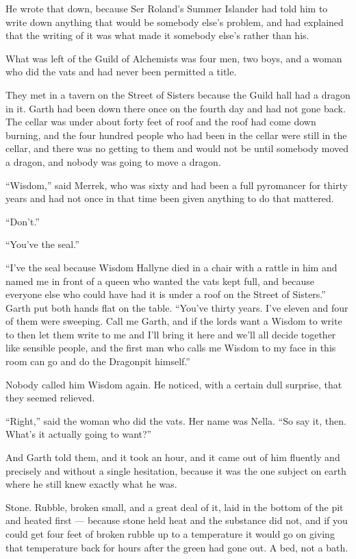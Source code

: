 He wrote that down, because Ser Roland’s Summer Islander had told him to write down anything that would be somebody else’s problem, and had explained that the writing of it was what made it somebody else’s rather than his.

\sceneBreak

What was left of the Guild of Alchemists was four men, two boys, and a woman who did the vats and had never been permitted a title.

They met in a tavern on the Street of Sisters because the Guild hall had a dragon in it. Garth had been down there once on the fourth day and had not gone back. The cellar was under about forty feet of roof and the roof had come down burning, and the four hundred people who had been in the cellar were still in the cellar, and there was no getting to them and would not be until somebody moved a dragon, and nobody was going to move a dragon.

“Wisdom,” said Merrek, who was sixty and had been a full pyromancer for thirty years and had not once in that time been given anything to do that mattered.

“Don’t.”

“You’ve the seal.”

“I’ve the seal because Wisdom Hallyne died in a chair with a rattle in him and named me in front of a queen who wanted the vats kept full, and because everyone else who could have had it is under a roof on the Street of Sisters.” Garth put both hands flat on the table. “You’ve thirty years. I’ve eleven and four of them were sweeping. Call me Garth, and if the lords want a Wisdom to write to then let them write to me and I’ll bring it here and we’ll all decide together like sensible people, and the first man who calls me Wisdom to my face in this room can go and do the Dragonpit himself.”

Nobody called him Wisdom again. He noticed, with a certain dull surprise, that they seemed relieved.

“Right,” said the woman who did the vats. Her name was Nella. “So say it, then. What’s it actually going to want?”

And Garth told them, and it took an hour, and it came out of him fluently and precisely and without a single hesitation, because it was the one subject on earth where he still knew exactly what he was.

Stone. Rubble, broken small, and a great deal of it, laid in the bottom of the pit and heated first — because stone held heat and the substance did not, and if you could get four feet of broken rubble up to a temperature it would go on giving that temperature back for hours after the green had gone out. A bed, not a bath.

